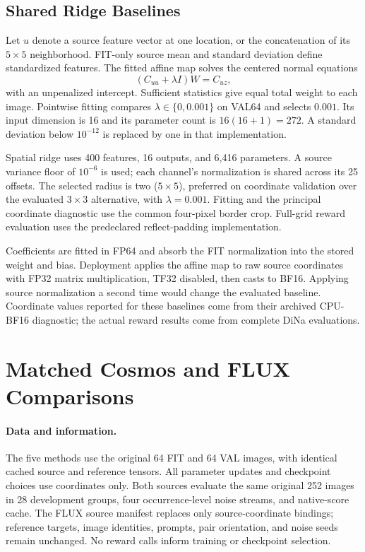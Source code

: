 \documentclass[10pt,twocolumn,letterpaper]{article}
\begin{document}
\subsection{Shared Ridge Baselines}
Let $u$ denote a source feature vector at one location, or the concatenation of its $5\times5$ neighborhood. FIT-only source mean and standard deviation define standardized features. The fitted affine map solves the centered normal equations
\begin{equation}
 (C_{uu}+\lambda I)W=C_{uz},
\end{equation}
with an unpenalized intercept. Sufficient statistics give equal total weight to each image. Pointwise fitting compares $\lambda\in\{0,0.001\}$ on VAL64 and selects $0.001$. Its input dimension is 16 and its parameter count is $16(16+1)=272$. A standard deviation below $10^{-12}$ is replaced by one in that implementation.

Spatial ridge uses 400 features, 16 outputs, and 6,416 parameters. A source variance floor of $10^{-6}$ is used; each channel's normalization is shared across its 25 offsets. The selected radius is two ($5\times5$), preferred on coordinate validation over the evaluated $3\times3$ alternative, with $\lambda=0.001$. Fitting and the principal coordinate diagnostic use the common four-pixel border crop. Full-grid reward evaluation uses the predeclared reflect-padding implementation.

Coefficients are fitted in FP64 and absorb the FIT normalization into the stored weight and bias. Deployment applies the affine map to raw source coordinates with FP32 matrix multiplication, TF32 disabled, then casts to BF16. Applying source normalization a second time would change the evaluated baseline. Coordinate values reported for these baselines come from their archived CPU-BF16 diagnostic; the actual reward results come from complete DiNa evaluations.

\section{Matched Cosmos and FLUX Comparisons}
\label{sec:matched-protocol}
\paragraph{Data and information.}
The five methods use the original 64 FIT and 64 VAL images, with identical cached source and reference tensors. All parameter updates and checkpoint choices use coordinates only. Both sources evaluate the same original 252 images in 28 development groups, four occurrence-level noise streams, and native-score cache. The FLUX source manifest replaces only source-coordinate bindings; reference targets, image identities, prompts, pair orientation, and noise seeds remain unchanged. No reward calls inform training or checkpoint selection.
\end{document}
